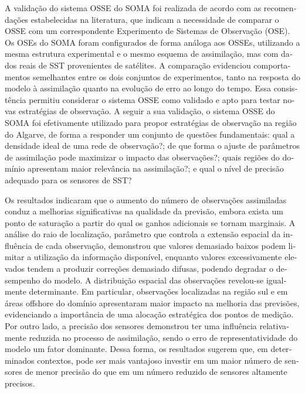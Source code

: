 \documentclass{auxfiles/ualgphdcls}
\begin{document}
\begin{otherlanguage}{portuguese}
A validação do sistema OSSE do SOMA foi realizada de acordo com as recomendações estabelecidas na literatura, que indicam a necessidade de comparar o OSSE com um correspondente Experimento de Sistemas de Observação (OSE). Os OSEs do SOMA foram configurados de forma análoga aos OSSEs, utilizando a mesma estrutura experimental e o mesmo esquema de assimilação, mas com dados reais de SST provenientes de satélites. A comparação evidenciou comportamentos semelhantes entre os dois conjuntos de experimentos, tanto na resposta do modelo à assimilação quanto na evolução de erro ao longo do tempo. Essa consistência permitiu considerar o sistema OSSE como validado e apto para testar novas estratégias de observação. A seguir a sua validação, o sistema OSSE do SOMA foi efetivamente utilizado para propor estratégias de observação na região do Algarve, de forma a responder um conjunto de questões fundamentais: qual a densidade ideal de uma rede de observação?; de que forma o ajuste de parâmetros de assimilação pode maximizar o impacto das observações?; quais regiões do domínio apresentam maior relevância na assimilação?; e qual o nível de precisão adequado para os sensores de SST?

Os resultados indicaram que o aumento do número de observações assimiladas conduz a melhorias significativas na qualidade da previsão, embora exista um ponto de saturação a partir do qual os ganhos adicionais se tornam marginais. A análise do raio de localização, parâmetro que controla a extensão espacial da influência de cada observação, demonstrou que valores demasiado baixos podem limitar a utilização da informação disponível, enquanto valores excessivamente elevados tendem a produzir correções demasiado difusas, podendo degradar o desempenho do modelo. A distribuição espacial das observações revelou-se igualmente determinante. Em particular, observações localizadas na região sul e em áreas offshore do domínio apresentaram maior impacto na melhoria das previsões, evidenciando a importância de uma alocação estratégica dos pontos de medição. Por outro lado, a precisão dos sensores demonstrou ter uma influência relativamente reduzida no processo de assimilação, sendo o erro de representatividade do modelo um fator dominante. Dessa forma, os resultados sugerem que, em determinados contextos, pode ser mais vantajoso investir em um maior número de sensores de menor precisão do que em um número reduzido de sensores altamente precisos.


\end{otherlanguage}
\end{document}
